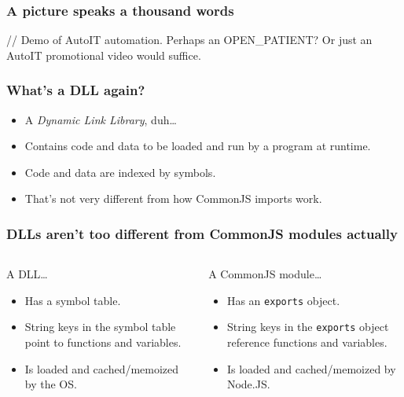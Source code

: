 \begin{frame}
	\frametitle{A picture speaks a thousand words}

	// Demo of AutoIT automation. Perhaps an OPEN\_PATIENT? Or just an AutoIT
	promotional video would suffice.
\end{frame}

\begin{frame}
	\frametitle{What’s a DLL again?}

	\begin{itemize}
		\item A {\em Dynamic Link Library}, duh…
		\item Contains code and data to be loaded and run by a program at runtime.
		\item Code and data are indexed by symbols.
		\item That’s not very different from how CommonJS imports work.
	\end{itemize}
\end{frame}

\begin{frame}
	\frametitle{DLLs aren’t too different from CommonJS modules actually}

	\begin{columns}
	\begin{column}{0.5\textwidth}
		A DLL…

		\begin{itemize}
			\item Has a symbol table.
			\item String keys in the symbol table point to functions and variables.
			\item Is loaded and cached/memoized by the OS.
		\end{itemize}
	\end{column}
	\begin{column}{0.5\textwidth}
		A CommonJS module…

		\begin{itemize}
			\item Has an \texttt{exports} object.
			\item String keys in the \texttt{exports} object reference functions and variables.
			\item Is loaded and cached/memoized by Node.JS.
		\end{itemize}
	\end{column}
	\end{columns}
\end{frame}

